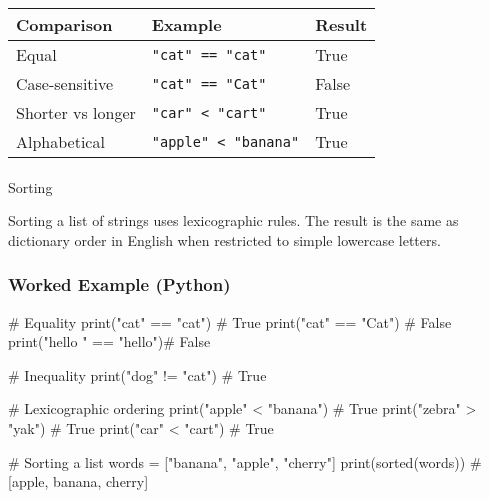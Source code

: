 \documentclass[
  letterpaper,
  DIV=11,
  numbers=noendperiod]{scrreprt}
\makeatletter
\let\oldparagraph\paragraph
\renewcommand{\paragraph}{
    \@ifstar
      \xxxParagraphStar
      \xxxParagraphNoStar
  }
\newcommand{\xxxParagraphStar}[1]{\oldparagraph*{#1}\mbox{}}
\newcommand{\xxxParagraphNoStar}[1]{\oldparagraph{#1}\mbox{}}
\newenvironment{Shaded}{\begin{snugshade}}{\end{snugshade}}
\newcommand{\BuiltInTok}[1]{\textcolor[rgb]{0.00,0.23,0.31}{#1}}
\newcommand{\CommentTok}[1]{\textcolor[rgb]{0.37,0.37,0.37}{#1}}
\newcommand{\NormalTok}[1]{\textcolor[rgb]{0.00,0.23,0.31}{#1}}
\newcommand{\OperatorTok}[1]{\textcolor[rgb]{0.37,0.37,0.37}{#1}}
\newcommand{\StringTok}[1]{\textcolor[rgb]{0.13,0.47,0.30}{#1}}
\makeatother
\begin{document}
\begin{longtable}[]{@{}lll@{}}
\toprule\noalign{}
Comparison & Example & Result \\
\midrule\noalign{}
\endhead
\bottomrule\noalign{}
\endlastfoot
Equal & \texttt{"cat"\ ==\ "cat"} & True \\
Case-sensitive & \texttt{"cat"\ ==\ "Cat"} & False \\
Shorter vs longer & \texttt{"car"\ \textless{}\ "cart"} & True \\
Alphabetical & \texttt{"apple"\ \textless{}\ "banana"} & True \\
\end{longtable}

\paragraph{Sorting}\label{sorting}

Sorting a list of strings uses lexicographic rules. The result is the
same as dictionary order in English when restricted to simple lowercase
letters.

\subsubsection{Worked Example (Python)}\label{worked-example-python-10}

\begin{Shaded}
\begin{Highlighting}[]
\CommentTok{\# Equality}
\BuiltInTok{print}\NormalTok{(}\StringTok{"cat"} \OperatorTok{==} \StringTok{"cat"}\NormalTok{)     }\CommentTok{\# True}
\BuiltInTok{print}\NormalTok{(}\StringTok{"cat"} \OperatorTok{==} \StringTok{"Cat"}\NormalTok{)     }\CommentTok{\# False}
\BuiltInTok{print}\NormalTok{(}\StringTok{"hello "} \OperatorTok{==} \StringTok{"hello"}\NormalTok{)}\CommentTok{\# False}

\CommentTok{\# Inequality}
\BuiltInTok{print}\NormalTok{(}\StringTok{"dog"} \OperatorTok{!=} \StringTok{"cat"}\NormalTok{)     }\CommentTok{\# True}

\CommentTok{\# Lexicographic ordering}
\BuiltInTok{print}\NormalTok{(}\StringTok{"apple"} \OperatorTok{\textless{}} \StringTok{"banana"}\NormalTok{) }\CommentTok{\# True}
\BuiltInTok{print}\NormalTok{(}\StringTok{"zebra"} \OperatorTok{\textgreater{}} \StringTok{"yak"}\NormalTok{)    }\CommentTok{\# True}
\BuiltInTok{print}\NormalTok{(}\StringTok{"car"} \OperatorTok{\textless{}} \StringTok{"cart"}\NormalTok{)     }\CommentTok{\# True}

\CommentTok{\# Sorting a list}
\NormalTok{words }\OperatorTok{=}\NormalTok{ [}\StringTok{"banana"}\NormalTok{, }\StringTok{"apple"}\NormalTok{, }\StringTok{"cherry"}\NormalTok{]}
\BuiltInTok{print}\NormalTok{(}\BuiltInTok{sorted}\NormalTok{(words))      }\CommentTok{\# [\textquotesingle{}apple\textquotesingle{}, \textquotesingle{}banana\textquotesingle{}, \textquotesingle{}cherry\textquotesingle{}]}
\end{Highlighting}
\end{Shaded}
\end{document}

